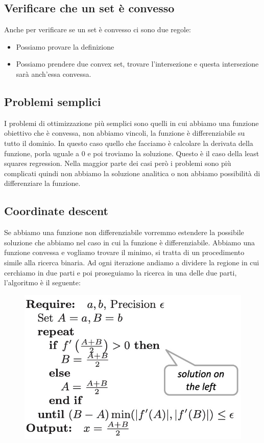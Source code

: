 \documentclass[14pt]{extreport}
\begin{document}
\subsection{Verificare che un set è convesso}

Anche per verificare se un set è convesso ci sono due regole:

\begin{itemize}
	\item Possiamo provare la definizione
	\item Possiamo prendere due convex set, trovare l'intersezione e questa intersezione sarà anch'essa convessa.
\end{itemize}


\subsection{Problemi semplici}

I problemi di ottimizzazione più semplici sono quelli in cui abbiamo una funzione obiettivo che è convessa, non abbiamo vincoli, la funzione è
differenziabile su tutto il dominio. In questo caso quello che facciamo è calcolare la derivata della funzione, porla uguale a 0 e poi troviamo la
soluzione. Questo è il caso della least squares regression. Nella maggior parte dei casi però i problemi sono più complicati quindi non abbiamo la
soluzione analitica o non abbiamo possibilità di differenziare la funzione.

\subsection{Coordinate descent}

Se abbiamo una funzione non differenziabile vorremmo estendere la possibile soluzione che abbiamo nel caso in cui la funzione è differenziabile.
Abbiamo una funzione convessa e vogliamo trovare il minimo, si tratta di un procedimento simile alla ricerca binaria. Ad ogni iterazione andiamo a
dividere la regione in cui cerchiamo in due parti e poi proseguiamo la ricerca in una delle due parti, l'algoritmo è il seguente:

\begin{figure}[H]
	\centering
	\includegraphics[width=0.7\linewidth]{236.jpeg}
\end{figure}
\end{document}
